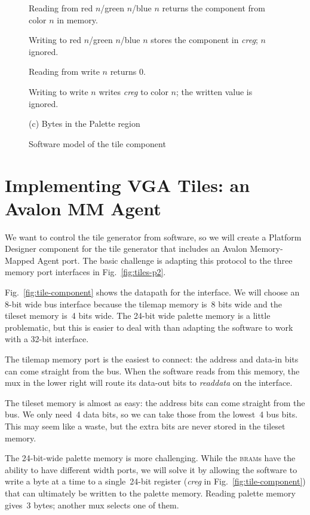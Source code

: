 \documentclass[11pt]{article}
\newcommand{\figref}[1]{Fig.~\ref{fig:#1}}
\begin{document}
\begin{figure}[p]
\begin{minipage}{0.45\textwidth}
  \footnotesize{}\baselineskip\raggedright

Reading from red $n$/green $n$/blue $n$ returns
the component from color $n$ in memory.

Writing to red $n$/green $n$/blue $n$ stores the component in
\emph{creg}; $n$ ignored.

Reading from write $n$ returns 0.

Writing to write $n$ writes \emph{creg} to color $n$; the written value is ignored.
\end{minipage}

\medskip

\centerline{(c) Bytes in the Palette region}

\caption{Software model of the tile component}
\label{fig:memmap} 
\end{figure}

\section{Implementing VGA Tiles: an Avalon MM Agent}

We want to control the tile generator from software, so we will create
a Platform Designer component for the tile generator that includes an
Avalon Memory-Mapped Agent port.  The basic challenge is adapting this
protocol to the three memory port interfaces in \figref{tiles-p2}.

\figref{tile-component} shows the datapath for the interface.  We will
choose an 8-bit wide bus interface because the tilemap memory is~8
bits wide and the tileset memory is~4 bits wide.  The 24-bit wide
palette memory is a little problematic, but this is easier to deal
with than adapting the software to work with a 32-bit interface.

The tilemap memory port is the easiest to connect: the address and
data-in bits can come straight from the bus.  When the software reads
from this memory, the mux in the lower right will route its data-out
bits to \emph{readdata} on the interface.

The tileset memory is almost as easy: the address bits can come
straight from the bus.  We only need~4 data bits, so we can take those
from the lowest~4 bus bits.  This may seem like a waste, but the extra
bits are never stored in the tileset memory.

The 24-bit-wide palette memory is more challenging.  While the
\textsc{bram}s have the ability to have different width ports, we will
solve it by allowing the software to write a byte at a time to a
single~24-bit register (\emph{creg} in \figref{tile-component}) that
can ultimately be written to the palette memory.  Reading palette
memory gives~3 bytes; another mux selects one of them.
\end{document}
